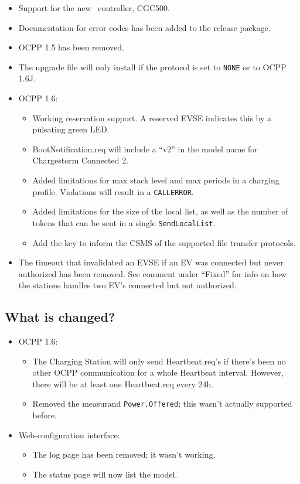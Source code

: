 \documentclass{scrartcl}
\begin{document}
\begin{itemize}
\item Support for the new \nanogrid\ controller, CGC500.
\item Documentation for error codes has been added to the release package.
\item OCPP 1.5 has been removed.
\item The upgrade file will only install if the protocol is set to
  \verb|NONE| or to OCPP 1.6J.
\item OCPP 1.6:
  \begin{itemize}
  \item Working reservation support. A reserved EVSE indicates this by a
    pulsating green LED.
  \item BootNotification.req will include a ``v2'' in the model name for
    Chargestorm Connected 2.
  \item Added limitations for max stack level and max periods in a charging
    profile. Violations will result in a \verb|CALLERROR|.
  \item Added limitations for the size of the local list, as well as the
    number of tokens that can be sent in a single \verb|SendLocalList|.
  \item Add the key to inform the CSMS of the supported file transfer
    protocols.
  \end{itemize}
\item The timeout that invalidated an EVSE if an EV was connected but never
  authorized has been removed. See comment under ``Fixed'' for info on how the
  stations handles two EV's connected but not authorized.
\end{itemize}

\subsection*{What is changed?}

\begin{itemize}
\item OCPP 1.6:
  \begin{itemize}
  \item The Charging Station will only send Heartbeat.req's if there's been no
    other OCPP communication for a whole Heartbeat interval. However, there
    will be at least one Heartbeat.req every 24h.
  \item Removed the measurand \verb|Power.Offered|; this wasn't actually
    supported before.
  \end{itemize}
\item Web-configuration interface:
  \begin{itemize}
  \item The log page has been removed; it wasn't working.
  \item The status page will now list the model.
  \end{itemize}

\end{itemize}
\end{document}
